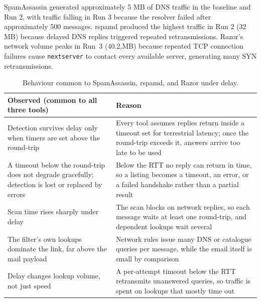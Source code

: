 SpamAssassin generated approximately 5 MB of DNS traffic in the baseline and Run 2, with traffic falling in Run 3 because the resolver failed after approximately 500 messages. rspamd produced the highest traffic in Run 2 (32 MB) because delayed DNS replies triggered repeated retransmissions. Razor's network volume peaks in Run~3 (40.2,MB) because repeated TCP connection failures cause \texttt{nextserver} to contact every available server, generating many SYN retransmissions.



\begin{table}[H]\centering
\footnotesize
\renewcommand{\arraystretch}{1.3}
\begin{tabular}{@{}p{5.2cm} p{7.0cm}@{}}
\toprule
\textbf{Observed (common to all three tools)} & \textbf{Reason} \\
\midrule

Detection survives delay only when timers are set above the round-trip &
Every tool assumes replies return inside a timeout set for terrestrial latency; once the round-trip exceeds it, answers arrive too late to be used \\

A timeout below the round-trip does not degrade gracefully; detection is lost or replaced by errors &
Below the RTT no reply can return in time, so a listing becomes a timeout, an error, or a failed handshake rather than a partial result \\

Scan time rises sharply under delay &
The scan blocks on network replies, so each message waits at least one round-trip, and dependent lookups wait several \\

The filter's own lookups dominate the link, far above the mail payload &
Network rules issue many DNS or catalogue queries per message, while the email itself is small by comparison \\

Delay changes lookup volume, not just speed &
A per-attempt timeout below the RTT retransmits unanswered queries, so traffic is spent on lookups that mostly time out \\

\bottomrule
\end{tabular}
\caption{Behaviour common to SpamAssassin, rspamd, and Razor under delay.}
\label{tab:results-common}
\end{table}


